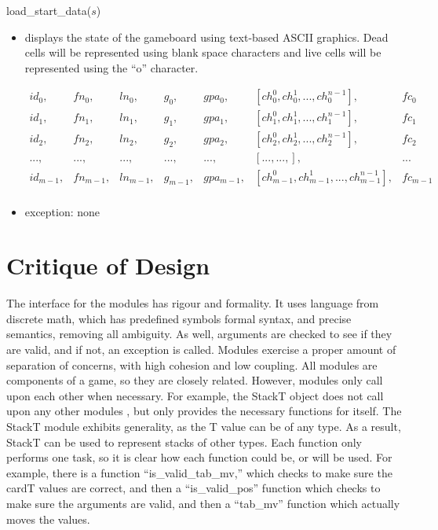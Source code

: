 \documentclass[12pt]{article}
\begin{document}
\noindent load\_start\_data($s$)
\begin{itemize}
\item displays the state of the gameboard using text-based ASCII graphics. Dead cells will be represented using blank space characters and live cells will be represented using the ``o'' character.

  \begin{equation}
    \begin{array}{ccccccc}
      id_0, & fn_0, & ln_0, & g_0, & gpa_0, & [ch_0^0, ch_0^1, ..., ch_0^{n-1}], & fc_0 \\
      id_1, & fn_1, & ln_1, & g_1, & gpa_1, & [ch_1^0, ch_1^1, ..., ch_1^{n-1}], & fc_1\\
      id_2, & fn_2, & ln_2, & g_2, & gpa_2, & [ch_2^0, ch_2^1, ..., ch_2^{n-1}], & fc_2
      \\
      ..., & ..., & ..., & ..., & ..., & [..., ..., ], & ...
      \\
      id_{m-1}, & fn_{m-1}, & ln_{m-1}, & g_{m-1}, & gpa_{m-1}, & [ch_{m-1}^0, ch_{m-1}^1, ..., ch_{m-1}^{n-1}], & fc_{m-1} \\
    \end{array}
  \end{equation}

\item exception: none
\end{itemize}

\newpage

\section*{Critique of Design}

The interface for the modules has rigour and formality. It uses language from discrete math, which has predefined symbols formal syntax, and precise semantics, removing all ambiguity. As well, arguments are checked to see if they are valid, and if not, an exception is called. Modules exercise a proper amount of separation of concerns, with high cohesion and low coupling. All modules are components of a game, so they are closely related. However, modules only call upon each other when necessary. For example, the StackT object does not call upon any other modules , but only provides the necessary functions for itself. The StackT module exhibits generality, as the T value can be of any type. As a result, StackT can be used to represent stacks of other types. Each function only performs one task, so it is clear how each function could be, or will be used. For example, there is a function ``is\_valid\_tab\_mv,'' which checks to make sure the cardT values are correct, and then a ``is\_valid\_pos'' function which checks to make sure the arguments are valid, and then a ``tab\_mv'' function which actually moves the values. \\
\end{document}
